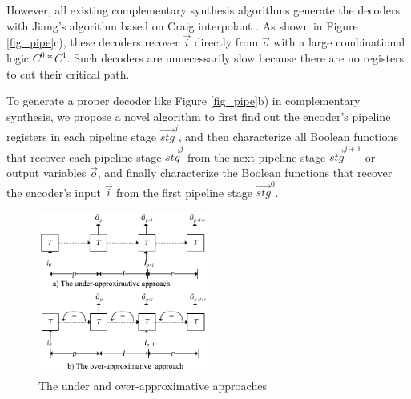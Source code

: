 \documentclass[twocolumn]{article}
\begin{document}
However,
all existing complementary synthesis algorithms \cite{ShenTCAD11,ShenTCAD12,LiuICCAD11,LiuTCAD12,TuDAC13}
generate the decoders with Jiang's algorithm \cite{InterpBoolFunction} 
based on Craig interpolant \cite{Craig}.
As shown in Figure \ref{fig_pipe}c),
these decoders recover $\vec{i}$ directly from $\vec{o}$ 
with a large combinational logic $C^0*C^1$.
Such decoders are unnecessarily slow because 
there are no registers to cut their critical path.


To generate a proper decoder like Figure \ref{fig_pipe}b) in complementary synthesis,
we propose a novel algorithm to first find out the encoder's pipeline registers in each pipeline stage $\vec{stg}^j$,
and then characterize all Boolean functions that recover each pipeline stage $\vec{stg}^j$
from the next pipeline stage $\vec{stg}^{j+1}$ or output variables $\vec{o}$,
and finally characterize the Boolean functions that recover the encoder's input $\vec{i}$
from the first pipeline stage $\vec{stg}^0$.

\begin{figure}[t]
\begin{center}
\includegraphics[width=0.5\textwidth]{pcln}
\end{center}
\caption{The under and over-approximative approaches}
  \label{fig_pc}
\end{figure}
\end{document}
